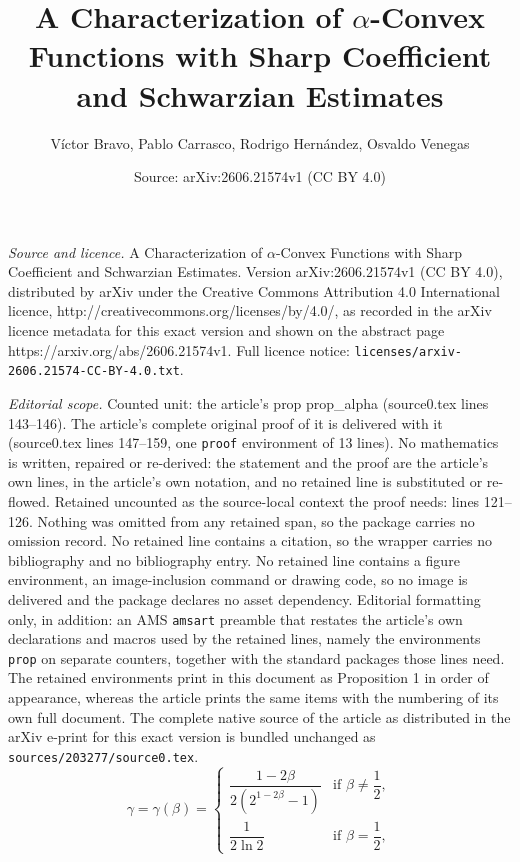 \documentclass[10pt,a4paper]{amsart}
\title{A Characterization of $\alpha$-Convex Functions with Sharp Coefficient and Schwarzian Estimates}
\author{V\'ictor Bravo, Pablo Carrasco, Rodrigo Hern\'andez, Osvaldo Venegas}
\date{Source: arXiv:2606.21574v1 (CC BY 4.0)}
\begin{document}
\maketitle

\noindent\emph{Source and licence.} A Characterization of $\alpha$-Convex Functions with Sharp Coefficient and Schwarzian Estimates. Version arXiv:2606.21574v1 (CC BY 4.0), distributed by arXiv under the Creative Commons Attribution 4.0 International licence, http://creativecommons.org/licenses/by/4.0/, as recorded in the arXiv licence metadata for this exact version and shown on the abstract page https://arxiv.org/abs/2606.21574v1. Full licence notice: \texttt{licenses/arxiv-2606.21574-CC-BY-4.0.txt}.\par\smallskip

\noindent\textit{Editorial scope.} Counted unit: the article's prop prop\_alpha (source0.tex lines 143--146). The article's complete original proof of it is delivered with it (source0.tex lines 147--159, one \texttt{proof} environment of 13 lines). No mathematics is written, repaired or re-derived: the statement and the proof are the article's own lines, in the article's own notation, and no retained line is substituted or re-flowed.  Retained uncounted as the source-local context the proof needs: lines 121--126.  Nothing was omitted from any retained span, so the package carries no omission record.  No retained line contains a citation, so the wrapper carries no bibliography and no bibliography entry.  No retained line contains a figure environment, an image-inclusion command or drawing code, so no image is delivered and the package declares no asset dependency.  Editorial formatting only, in addition: an AMS \texttt{amsart} preamble that restates the article's own declarations and macros used by the retained lines, namely the environments \texttt{prop} on separate counters, together with the standard packages those lines need.  The retained environments print in this document as Proposition 1 in order of appearance, whereas the article prints the same items with the numbering of its own full document.  The complete native source of the article as distributed in the arXiv e-print for this exact version is bundled unchanged as \texttt{sources/203277/source0.tex}.
\begin{equation}\label{eq:gamma}
\gamma = \gamma(\beta) = \begin{cases}
\dfrac{1-2\beta}{2(2^{1-2\beta}-1)} & \text{if } \beta \neq \dfrac{1}{2}, \\[6pt]
\dfrac{1}{2\ln 2} & \text{if } \beta = \dfrac{1}{2},
\end{cases}
\end{equation}
\end{document}
